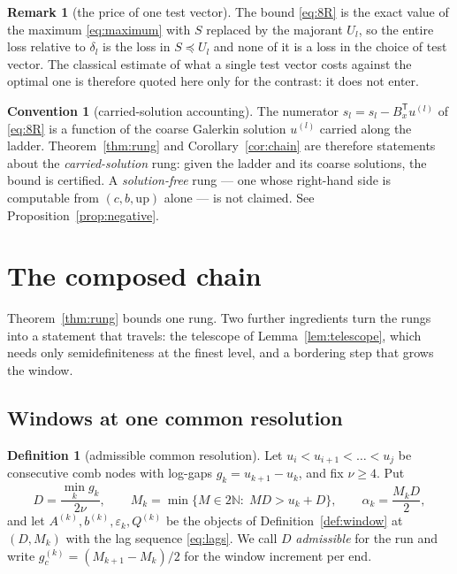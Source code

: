 \documentclass[11pt,a4paper]{article}
\theoremstyle{plain}
\theoremstyle{definition}
\newtheorem{definition}[theorem]{Definition}
\newtheorem{convention}[theorem]{Convention}
\newtheorem{remark}[theorem]{Remark}
\newcommand{\N}{\mathbb{N}}
\newcommand{\T}{\mathsf{T}}
\newcommand{\shat}{\widehat{s}}
\begin{document}
\begin{remark}[the price of one test vector]
\label{rem:kantorovich}
The bound \eqref{eq:8R} is the exact value of the maximum \eqref{eq:maximum} with $S$
replaced by the majorant $U_{l}$, so the entire loss relative to $\delta_{l}$ is the
loss in $S\preceq U_{l}$ and none of it is a loss in the choice of test vector. The
classical estimate of what a single test vector costs against the optimal one
\cite{Kantorovich1948} is therefore quoted here only for the contrast: it does not
enter.
\end{remark}

\begin{convention}[carried-solution accounting]
\label{conv:carried}
The numerator $\shat_{l}=s_{l}-B_{x}^{\T}u^{(l)}$ of \eqref{eq:8R} is a
function of the coarse Galerkin solution $u^{(l)}$ carried along the ladder.
Theorem~\ref{thm:rung} and Corollary~\ref{cor:chain} are therefore statements about
the \emph{carried-solution} rung: given the ladder and its coarse solutions, the
bound is certified. A \emph{solution-free} rung --- one whose right-hand side is
computable from $(c,b,\mathrm{up})$ alone --- is not claimed. See
Proposition~\ref{prop:negative}.
\end{convention}

\section{The composed chain}
\label{sec:chain}

Theorem~\ref{thm:rung} bounds one rung. Two further ingredients turn the rungs into
a statement that travels: the telescope of Lemma~\ref{lem:telescope}, which needs
only semidefiniteness at the finest level, and a bordering step that grows the
window.

\subsection{Windows at one common resolution}

\begin{definition}[admissible common resolution]
\label{def:admissible}
Let $u_{i}<u_{i+1}<\dots<u_{j}$ be consecutive comb nodes with log-gaps
$g_{k}=u_{k+1}-u_{k}$, and fix $\nu\ge4$. Put
\begin{equation}
\label{eq:D}
  D=\frac{\min_{k}g_{k}}{2\nu},
  \qquad
  M_{k}=\min\bigl\{M\in2\N:\;MD>u_{k}+D\bigr\},
  \qquad
  \alpha_{k}=\frac{M_{k}D}{2},
\end{equation}
and let $A^{(k)},b^{(k)},\varepsilon_{k},Q^{(k)}$ be the objects of
Definition~\ref{def:window} at $(D,M_{k})$ with the lag sequence \eqref{eq:lags}.
We call $D$ \emph{admissible} for the run and write $g_{c}^{(k)}=(M_{k+1}-M_{k})/2$
for the window increment per end.
\end{definition}
\end{document}
